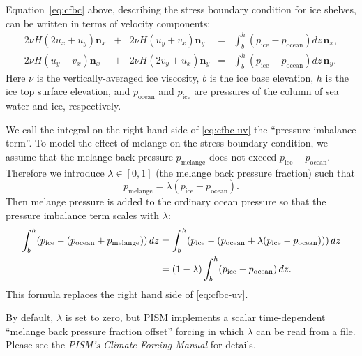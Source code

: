 Equation~\eqref{eq:cfbc} above, describing the stress boundary condition for ice shelves, can be written in terms of velocity components:
\newcommand{\psw}{p_{\text{ocean}}}
\newcommand{\pice}{p_{\text{ice}}}
\newcommand{\pmelange}{p_{\text{melange}}}
\newcommand{\n}{\mathbf{n}}
\newcommand{\nx}{\n_{x}}
\newcommand{\ny}{\n_{y}}
\begin{equation}
  \label{eq:cfbc-uv}
  \begin{array}{lclcl}
    2 \nu H (2u_x + u_y) \nx &+& 2 \nu H (u_y + v_x)  \ny &=& \displaystyle \int_{b}^{h}(\pice - \psw) dz\, \nx,\\
    2 \nu H (u_y + v_x)  \nx &+& 2 \nu H (2v_y + u_x) \ny &=& \displaystyle \int_{b}^{h}(\pice - \psw) dz\, \ny.
  \end{array}
\end{equation}
Here $\nu$ is the vertically-averaged ice viscosity, $b$ is the ice base elevation, $h$ is the ice top surface elevation, and $\psw$ and $\pice$ are pressures of the column of sea water and ice, respectively.

We call the integral on the right hand side of \eqref{eq:cfbc-uv} the ``pressure imbalance term''.  To model the effect of melange \cite{Amundsonetal2010} on the stress boundary condition, we assume that the melange back-pressure $\pmelange$ does not exceed $\pice - \psw$.  Therefore we introduce $\lambda \in [0,1]$ (the melange back pressure fraction) such that
\begin{equation*}
  \pmelange = \lambda (\pice - \psw).
\end{equation*}
Then melange pressure is added to the ordinary ocean pressure so that the pressure imbalance term scales with $\lambda$:
\begin{align}
\int_{b}^{h}(\pice - (\psw + \pmelange))\, dz &= \int_{b}^{h}(\pice - (\psw + \lambda(\pice - \psw)))\, dz \notag \\
&= (1 - \lambda) \int_{b}^{h} (\pice - \psw)\, dz.  \label{eq:cfbc-3}
\end{align}
This formula replaces the right hand side of \eqref{eq:cfbc-uv}.

By default, $\lambda$ is set to zero, but PISM implements a scalar time-dependent ``melange back pressure fraction offset'' forcing in which $\lambda$ can be read from a file.  Please see the \emph{PISM's Climate Forcing Manual} for details.


